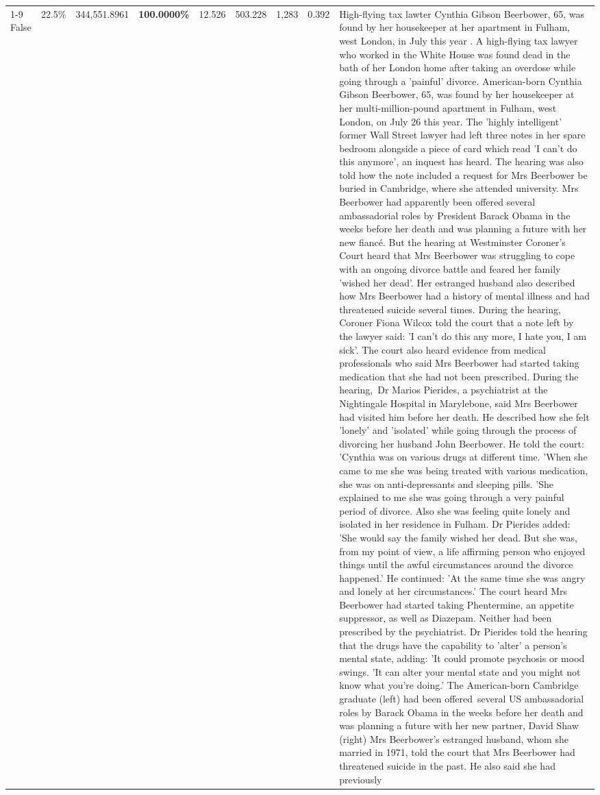 \begin{table}[H]
\begin{tabular}{lllrlllll}
\cline{1-9}
False & 22.5\% & 344,551.8961 & \bfseries \color{red} 100.0000\% & 12.526 & 503.228 & 1,283 & 0.392 & High-flying tax lawter Cynthia Gibson Beerbower, 65, was found by her housekeeper at her apartment in Fulham, west London, in July this year . A high-flying tax lawyer who worked in the White House was found dead in the bath of her London home after taking an overdose while going through a 'painful' divorce. American-born Cynthia Gibson Beerbower, 65, was found by her housekeeper at her multi-million-pound apartment in Fulham, west London, on July 26 this year. The 'highly intelligent' former Wall Street lawyer had left three notes in her spare bedroom alongside a piece of card which read 'I can't do this anymore', an inquest has heard. The hearing was also told how the note included a request for Mrs Beerbower be buried in Cambridge, where she attended university. Mrs Beerbower had apparently been offered several ambassadorial roles by President Barack Obama in the weeks before her death and was planning a future with her new fiancé. But the hearing at Westminster Coroner's Court heard that Mrs Beerbower was struggling to cope with an ongoing divorce battle and feared her family 'wished her dead'. Her estranged husband also described how Mrs Beerbower had a history of mental illness and had threatened suicide several times. During the hearing, Coroner Fiona Wilcox told the court that a note left by the lawyer said: 'I can't do this any more, I hate you, I am sick'. The court also heard evidence from medical professionals who said Mrs Beerbower had started taking medication that she had not been prescribed. During the hearing, Dr Marios Pierides, a psychiatrist at the Nightingale Hospital in Marylebone, said Mrs Beerbower had visited him before her death. He described how she felt 'lonely' and 'isolated' while going through the process of divorcing her husband John Beerbower. He told the court: 'Cynthia was on various drugs at different time. 'When she came to me she was being treated with various medication, she was on anti-depressants and sleeping pills. 'She explained to me she was going through a very painful period of divorce. Also she was feeling quite lonely and isolated in her residence in Fulham. Dr Pierides added: 'She would say the family wished her dead. But she was, from my point of view, a life affirming person who enjoyed things until the awful circumstances around the divorce happened.' He continued: 'At the same time she was angry and lonely at her circumstances.' The court heard Mrs Beerbower had started taking Phentermine, an appetite suppressor, as well as Diazepam. Neither had been prescribed by the psychiatrist. Dr Pierides told the hearing that the drugs have the capability to 'alter' a person's mental state, adding: 'It could promote psychosis or mood swings. 'It can alter your mental state and you might not know what you're doing.' The American-born Cambridge graduate (left) had been offered several US ambassadorial roles by Barack Obama in the weeks before her death and was planning a future with her new partner, David Shaw (right) Mrs Beerbower's estranged husband, whom she married in 1971, told the court that Mrs Beerbower had threatened suicide in the past. He also said she had previously 
\end{tabular}
\end{table}
